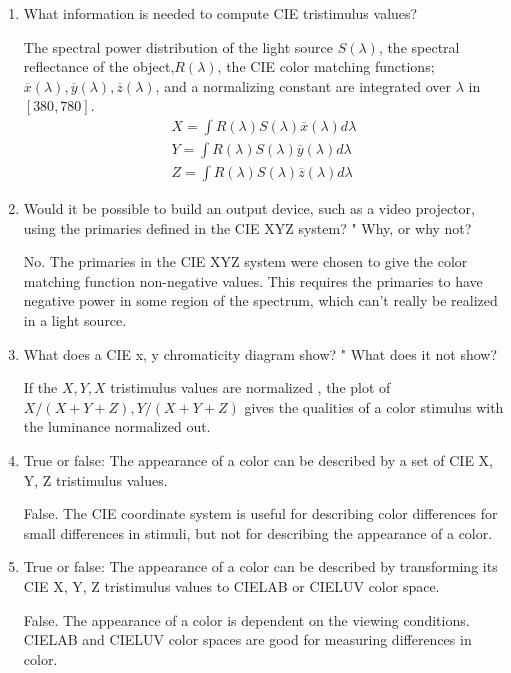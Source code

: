 \begin{enumerate}
\item What information is needed to compute CIE tristimulus
values? \par The spectral power distribution of the light source
\(S(\lambda)\), the spectral reflectance of the
object,\(R(\lambda)\), the CIE color matching functions;
\begin{math}\overline{x}(\lambda),\overline{y}(\lambda),\overline{z}(\lambda)
\end{math}, and a normalizing constant are integrated over \(
\lambda \) in \( [380,780] \).
\begin{eqnarray}
 \nonumber X = \int R(\lambda) S(\lambda) \overline{x}(\lambda) d\lambda \\
 \nonumber Y = \int R(\lambda) S(\lambda) \overline{y}(\lambda)
d\lambda \\ \nonumber Z = \int R(\lambda) S(\lambda)
\overline{z}(\lambda) d\lambda
\end{eqnarray}

\item Would it be possible to build an output device, such as a
video projector, using the primaries defined in the CIE XYZ
system? " Why, or why not? \par No.  The primaries in the CIE XYZ
system were chosen to give the color matching function
non-negative values.  This requires the primaries to have negative
power in some region of the spectrum, which can't really be
realized in a light source.

\item What does a CIE x, y chromaticity diagram show? "   What
does it not show? \par If the $X, Y, X$  tristimulus values are
normalized , the plot of $X/(X+Y+Z), Y/(X+Y+Z)$ gives the
qualities of a color stimulus with the luminance normalized out.

\item True or false: The appearance of a color can be described by
a set of CIE X, Y, Z tristimulus values.\par False.  The CIE
coordinate system is useful for describing color differences for
small differences in stimuli, but not for describing the
appearance of a color.

\item True or false: The appearance of a color can be described by
transforming its CIE X, Y, Z tristimulus values to CIELAB or
CIELUV color space.
\par  False.   The appearance of a color is dependent on the
viewing conditions.  CIELAB and CIELUV color spaces are good for
measuring differences in color.


\end{enumerate}
